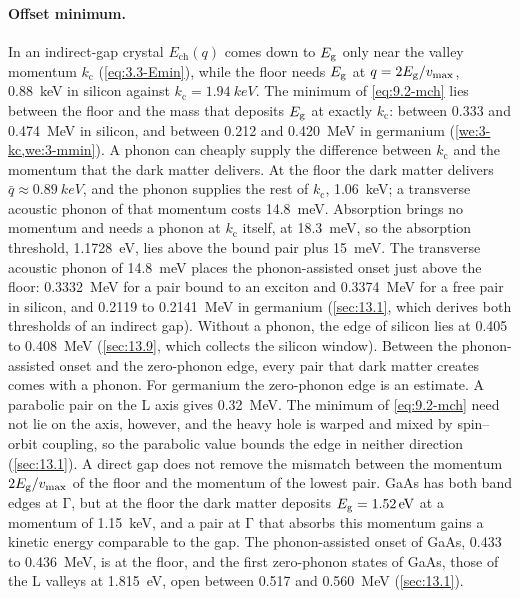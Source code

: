 \paragraph{Offset minimum.} In an indirect-gap crystal $E_{\mathrm{ch}}(q)$ comes down to $E_{\mathrm{g}}$ only near the valley momentum $k_{\mathrm{c}}$ (\cref{eq:3.3-Emin}), while the floor needs $E_{\mathrm{g}}$ at $q = 2E_{\mathrm{g}}/v_{\mathrm{max}}$, \SI{0.88}{keV} in silicon against $k_{\mathrm{c}} = \SI{1.94}{keV}$. The minimum of \cref{eq:9.2-mch} lies between the floor and the mass that deposits $E_{\mathrm{g}}$ at exactly $k_{\mathrm{c}}$: between 0.333 and \SI{0.474}{MeV} in silicon, and between 0.212 and \SI{0.420}{MeV} in germanium (\cref{we:3-kc,we:3-mmin}). A phonon can cheaply supply the difference between $k_{\mathrm{c}}$ and the momentum that the dark matter delivers. At the floor the dark matter delivers $\bar q \approx \SI{0.89}{keV}$, and the phonon supplies the rest of $k_{\mathrm{c}}$, \SI{1.06}{keV}; a transverse acoustic phonon of that momentum costs \SI{14.8}{meV}. Absorption brings no momentum and needs a phonon at $k_{\mathrm{c}}$ itself, at \SI{18.3}{meV}, so the absorption threshold, \SI{1.1728}{eV}, lies above the bound pair plus \SI{15}{meV}. The transverse acoustic phonon of \SI{14.8}{meV} places the phonon-assisted onset just above the floor: \SI{0.3332}{MeV} for a pair bound to an exciton and \SI{0.3374}{MeV} for a free pair in silicon, and 0.2119 to \SI{0.2141}{MeV} in germanium (\cref{sec:13.1}, which derives both thresholds of an indirect gap). Without a phonon, the edge of silicon lies at 0.405 to \SI{0.408}{MeV} (\cref{sec:13.9}, which collects the silicon window). Between the phonon-assisted onset and the zero-phonon edge, every pair that dark matter creates comes with a phonon. For germanium the zero-phonon edge is an estimate. A parabolic pair on the L axis gives \SI{0.32}{MeV}. The minimum of \cref{eq:9.2-mch} need not lie on the axis, however, and the heavy hole is warped and mixed by spin--orbit coupling, so the parabolic value bounds the edge in neither direction (\cref{sec:13.1}). A direct gap does not remove the mismatch between the momentum $2E_{\mathrm{g}}/v_{\mathrm{max}}$ of the floor and the momentum of the lowest pair. GaAs has both band edges at $\mathrm{\Gamma}$, but at the floor the dark matter deposits $E_{\mathrm{g}} = \SI{1.52}{eV}$ at a momentum of \SI{1.15}{keV}, and a pair at $\mathrm{\Gamma}$ that absorbs this momentum gains a kinetic energy comparable to the gap. The phonon-assisted onset of GaAs, 0.433 to \SI{0.436}{MeV}, is at the floor, and the first zero-phonon states of GaAs, those of the L valleys at \SI{1.815}{eV}, open between 0.517 and \SI{0.560}{MeV} (\cref{sec:13.1}).

